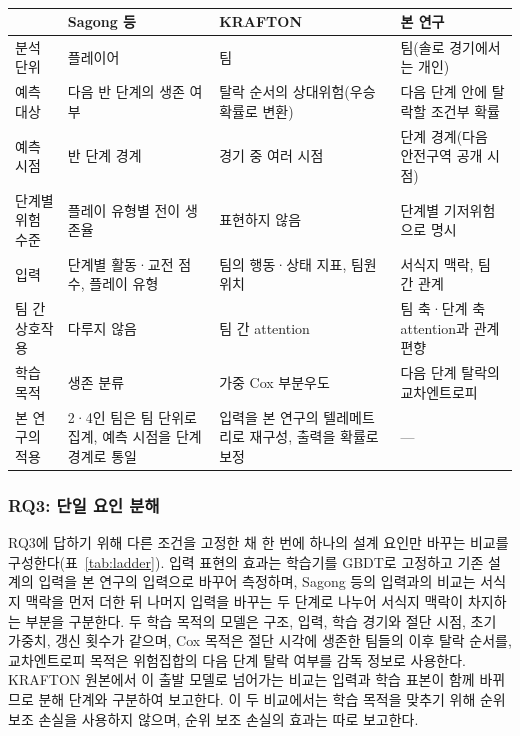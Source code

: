 \begin{table}[t]
\centering
\caption{}
\label{tab:compare}
\footnotesize
\renewcommand{\arraystretch}{1.2}
\begin{tabular}{p{2.3cm}p{4.3cm}p{4.6cm}p{4.6cm}}
\hline
 & Sagong 등~\cite{Sagong25a} & KRAFTON~\cite{KRAFTON} & 본 연구 \\
\hline
분석 단위 & 플레이어 & 팀 & 팀(솔로 경기에서는 개인) \\
예측 대상 & 다음 반 단계의 생존 여부 & 탈락 순서의 상대위험(우승확률로 변환) & 다음 단계 안에 탈락할 조건부 확률 \\
예측 시점 & 반 단계 경계 & 경기 중 여러 시점 & 단계 경계(다음 안전구역 공개 시점) \\
단계별 위험 수준 & 플레이 유형별 전이 생존율 & 표현하지 않음 & 단계별 기저위험으로 명시 \\
입력 & 단계별 활동·교전 점수, 플레이 유형 & 팀의 행동·상태 지표, 팀원 위치 & 서식지 맥락, 팀 간 관계 \\
팀 간 상호작용 & 다루지 않음 & 팀 간 attention & 팀 축·단계 축 attention과 관계 편향 \\
학습 목적 & 생존 분류 & 가중 Cox 부분우도 & 다음 단계 탈락의 교차엔트로피 \\
\hline
본 연구의 적용 & 2·4인 팀은 팀 단위로 집계, 예측 시점을 단계 경계로 통일 & 입력을 본 연구의 텔레메트리로 재구성, 출력을 확률로 보정 & --- \\
\hline
\end{tabular}
\end{table}

\subsubsection{RQ3: 단일 요인 분해}
\label{sec:method:decomposition}
RQ3에 답하기 위해 다른 조건을 고정한 채 한 번에 하나의 설계 요인만 바꾸는 비교를 구성한다(표~\ref{tab:ladder}).
입력 표현의 효과는 학습기를 GBDT로 고정하고 기존 설계의 입력을 본 연구의 입력으로 바꾸어 측정하며, Sagong 등의 입력과의 비교는 서식지 맥락을 먼저 더한 뒤 나머지 입력을 바꾸는 두 단계로 나누어 서식지 맥락이 차지하는 부분을 구분한다.
두 학습 목적의 모델은 구조, 입력, 학습 경기와 절단 시점, 초기 가중치, 갱신 횟수가 같으며, Cox 목적은 절단 시각에 생존한 팀들의 이후 탈락 순서를, 교차엔트로피 목적은 위험집합의 다음 단계 탈락 여부를 감독 정보로 사용한다.
KRAFTON 원본에서 이 출발 모델로 넘어가는 비교는 입력과 학습 표본이 함께 바뀌므로 분해 단계와 구분하여 보고한다.
이 두 비교에서는 학습 목적을 맞추기 위해 순위 보조 손실을 사용하지 않으며, 순위 보조 손실의 효과는 따로 보고한다.

